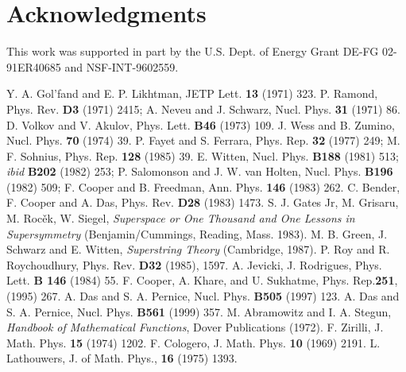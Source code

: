 \documentclass[a4paper,11pt]{article}
\begin{document}
\section*{Acknowledgments}


This work was supported in part by the U.S. Dept. of
Energy Grant  DE-FG 02-91ER40685 and NSF-INT-9602559.
 


\begin{thebibliography}{99}
 Y. A. Gol'fand and E. P. Likhtman, JETP Lett. {\bf 13}
(1971) 323.
 P. Ramond, Phys. Rev. {\bf D3} (1971) 2415; A. Neveu and
J. Schwarz, Nucl. Phys. {\bf 31} (1971) 86.
 D. Volkov and V. Akulov, Phys. Lett. {\bf B46} (1973)
109.
 J. Wess and B. Zumino, Nucl. Phys. {\bf 70} (1974) 39.
 P. Fayet and S. Ferrara, Phys. Rep. {\bf 32} (1977)
249; M. F. Sohnius,  Phys. Rep. {\bf 128} (1985) 39.
 E. Witten, Nucl. Phys. {\bf B188} (1981) 513; {\it ibid}
{\bf B202} (1982) 253; P. Salomonson and J. W. van Holten,
Nucl. Phys. {\bf B196} (1982) 509; F. Cooper and B. Freedman,
Ann. Phys. {\bf 146} (1983) 262.
 C. Bender, F. Cooper and A. Das, Phys. Rev. {\bf D28}
(1983) 1473.
S. J. Gates Jr, M. Grisaru, M. Roc\v{e}k, W. Siegel,
{\it Superspace or One Thousand and One Lessons in Supersymmetry}
(Benjamin/Cummings, Reading, Mass. 1983).
 M. B. Green, J. Schwarz and E. Witten, {\it Superstring
Theory} (Cambridge, 1987).
 P. Roy and R. Roychoudhury,  Phys. Rev.
 {\bf D32} (1985), 1597.
 A. Jevicki, J. Rodrigues, Phys. Lett. {\bf B
146} (1984) 55.
 F. Cooper, A. Khare, and U. Sukhatme,
Phys. Rep.{\bf 251}, (1995) 267.
 A. Das and S. A. Pernice, Nucl. Phys. {\bf B505} (1997)
123.
 A. Das and S. A. Pernice, Nucl. Phys. {\bf B561} (1999) 357.
 M. Abramowitz and I. A. Stegun, {\it Handbook
of Mathematical Functions}, Dover Publications (1972).
 F. Zirilli, J. Math. Phys. {\bf 15} (1974) 1202.
 F. Cologero, J. Math. Phys. {\bf 10} (1969) 2191.
 L. Lathouwers, J. of Math. Phys., {\bf 16}
(1975) 1393.

\end{thebibliography}
\end{document}
